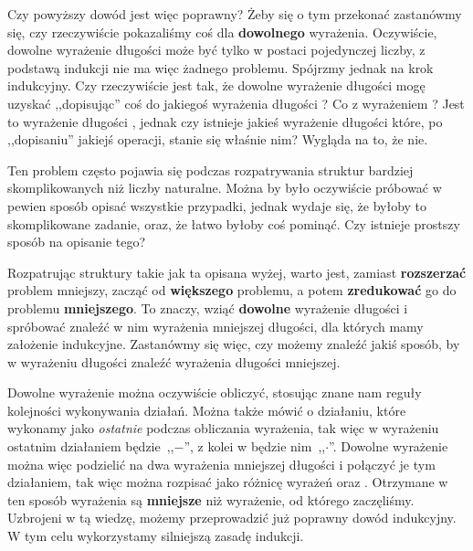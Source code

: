 Czy powyższy dowód jest więc poprawny? Żeby się o tym przekonać zastanówmy się, czy rzeczywiście pokazaliśmy coś dla \textbf{dowolnego} wyrażenia. Oczywiście, dowolne wyrażenie długości  może być tylko w postaci pojedynczej liczby, z podstawą indukcji nie ma więc żadnego problemu. Spójrzmy jednak na krok indukcyjny. Czy rzeczywiście jest tak, że dowolne wyrażenie długości  mogę uzyskać ,,dopisując'' coś do jakiegoś wyrażenia długości ? Co z wyrażeniem ? Jest to wyrażenie długości , jednak czy istnieje jakieś wyrażenie długości  które, po ,,dopisaniu'' jakiejś operacji, stanie się właśnie nim? Wygląda na to, że nie.

Ten problem często pojawia się podczas rozpatrywania struktur bardziej skomplikowanych niż liczby naturalne. Można by było oczywiście próbować w pewien sposób opisać wszystkie przypadki, jednak wydaje się, że byłoby to skomplikowane zadanie, oraz, że łatwo byłoby coś pominąć. Czy istnieje prostszy sposób na opisanie tego?

Rozpatrując struktury takie jak ta opisana wyżej, warto jest, zamiast \textbf{rozszerzać} problem mniejszy, zacząć od \textbf{większego} problemu, a potem \textbf{zredukować} go do problemu \textbf{mniejszego}. To znaczy, wziąć \textbf{dowolne} wyrażenie długości  i spróbować znaleźć w nim wyrażenia mniejszej długości, dla których mamy założenie indukcyjne. Zastanówmy się więc, czy możemy znaleźć jakiś sposób, by w wyrażeniu długości  znaleźć wyrażenia długości mniejszej.

Dowolne wyrażenie można oczywiście obliczyć, stosując znane nam reguły kolejności wykonywania działań. Można także mówić o działaniu, które wykonamy jako \textit{ostatnie} podczas obliczania wyrażenia, tak więc w wyrażeniu  ostatnim działaniem będzie~,,$-$'', z kolei w  będzie nim~,,$\cdot$''. Dowolne wyrażenie można więc podzielić na dwa wyrażenia mniejszej długości i połączyć je tym działaniem, tak więc  można rozpisać jako różnicę wyrażeń  oraz . Otrzymane w ten sposób wyrażenia są \textbf{mniejsze} niż wyrażenie, od którego zaczęliśmy. Uzbrojeni w tą wiedzę, możemy przeprowadzić już poprawny dowód indukcyjny. W tym celu wykorzystamy silniejszą zasadę indukcji.

